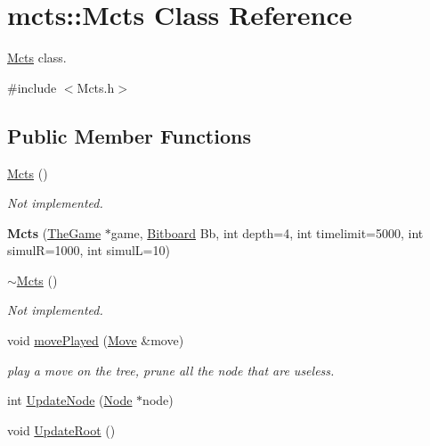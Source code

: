 \hypertarget{classmcts_1_1_mcts}{\section{mcts\+:\+:Mcts Class Reference}
\label{classmcts_1_1_mcts}
}


\hyperlink{classmcts_1_1_mcts}{Mcts} class.  




{\ttfamily \#include $<$Mcts.\+h$>$}

\subsection*{Public Member Functions}
\begin{DoxyCompactItemize}
\item 
\hyperlink{classmcts_1_1_mcts_ad02b46adb483edd120569db71cb4d3f7}{Mcts} ()
\begin{DoxyCompactList}\small\item\em Not implemented. \end{DoxyCompactList}\item 
\hypertarget{classmcts_1_1_mcts_ada746c82f9fa57b87faaff6f26cf8b6d}{{\bfseries Mcts} (\hyperlink{class_the_game}{The\+Game} $\ast$game, \hyperlink{class_bitboard}{Bitboard} Bb, int depth=4, int timelimit=5000, int simul\+R=1000, int simul\+L=10)}\label{classmcts_1_1_mcts_ada746c82f9fa57b87faaff6f26cf8b6d}

\item 
\hypertarget{classmcts_1_1_mcts_afb758831416d24b400def54eeda53122}{\hyperlink{classmcts_1_1_mcts_afb758831416d24b400def54eeda53122}{$\sim$\+Mcts} ()}\label{classmcts_1_1_mcts_afb758831416d24b400def54eeda53122}

\begin{DoxyCompactList}\small\item\em Not implemented. \end{DoxyCompactList}\item 
void \hyperlink{classmcts_1_1_mcts_ac35bbdb3901e141afb1fa59fe27e09ef}{move\+Played} (\hyperlink{class_move}{Move} \&move)
\begin{DoxyCompactList}\small\item\em play a move on the tree, prune all the node that are useless. \end{DoxyCompactList}\item 
int \hyperlink{classmcts_1_1_mcts_a52f93c0ecdf18f8e1755c7d2007923b6}{Update\+Node} (\hyperlink{classmcts_1_1_node}{Node} $\ast$node)
\item 
\hypertarget{classmcts_1_1_mcts_aa9ac3cc5372f4fc2617fcb0aa44b278e}{void \hyperlink{classmcts_1_1_mcts_aa9ac3cc5372f4fc2617fcb0aa44b278e}{Update\+Root} ()}\label{classmcts_1_1_mcts_aa9ac3cc5372f4fc2617fcb0aa44b278e}


\end{DoxyCompactItemize}
